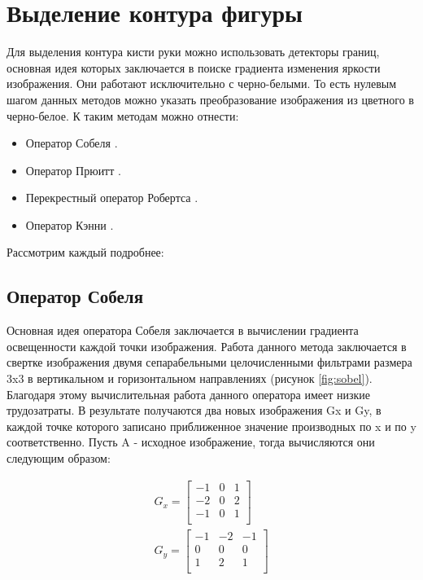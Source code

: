 \section{Выделение контура фигуры}
\label{sec:Edge}

Для выделения контура кисти руки можно использовать детекторы границ, основная идея которых заключается в поиске градиента изменения яркости изображения. Они работают исключительно с черно-белыми. То есть нулевым шагом данных методов можно указать преобразование изображения из цветного в черно-белое. К таким методам можно отнести:

\begin{itemize}
	\item Оператор Собеля \cite{Sobel}.
	\item Оператор Прюитт \cite{Prewitt}.
	\item Перекрестный оператор Робертса \cite{Roberts}.
	\item Оператор Кэнни \cite{Canny}.
\end{itemize}

Рассмотрим каждый подробнее:

\subsection{Оператор Собеля}

Основная идея оператора Собеля\cite{Sobel} заключается в вычислении градиента освещенности каждой точки изображения. Работа данного метода заключается в  свертке изображения двумя сепарабельными целочисленными фильтрами размера 3x3 в вертикальном и горизонтальном направлениях (рисунок \ref{fig:sobel}). Благодаря этому вычислительная работа данного оператора имеет низкие трудозатраты. В результате получаются два новых изображения Gx и Gy, в каждой точке которого записано приближенное значение производных по x и по y соответственно. Пусть A - исходное изображение, тогда вычисляются они следующим образом:

\begin{eqnarray}\label{eq:sobel-matrixs}
G_x = \begin{bmatrix}
-1 & 0 & 1\\
-2 & 0 & 2\\
-1 & 0 & 1\\
\end{bmatrix} \\
G_y = \begin{bmatrix}
-1 & -2 & -1\\
0 & 0 & 0\\
1 & 2 & 1\\
\end{bmatrix}
\end{eqnarray}

